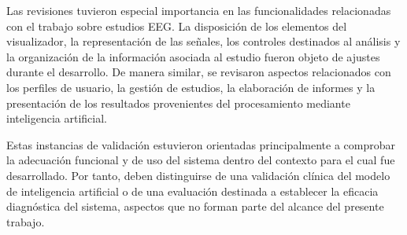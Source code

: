 Las revisiones tuvieron especial importancia en las funcionalidades
relacionadas con el trabajo sobre estudios EEG. La disposición de los
elementos del visualizador, la representación de las señales, los controles
destinados al análisis y la organización de la información asociada al estudio
fueron objeto de ajustes durante el desarrollo. De manera similar, se revisaron
aspectos relacionados con los perfiles de usuario, la gestión de estudios, la
elaboración de informes y la presentación de los resultados provenientes del
procesamiento mediante inteligencia artificial.

Estas instancias de validación estuvieron orientadas principalmente a comprobar
la adecuación funcional y de uso del sistema dentro del contexto para el cual
fue desarrollado. Por tanto, deben distinguirse de una validación clínica del
modelo de inteligencia artificial o de una evaluación destinada a establecer
la eficacia diagnóstica del sistema, aspectos que no forman parte del alcance
del presente trabajo.

